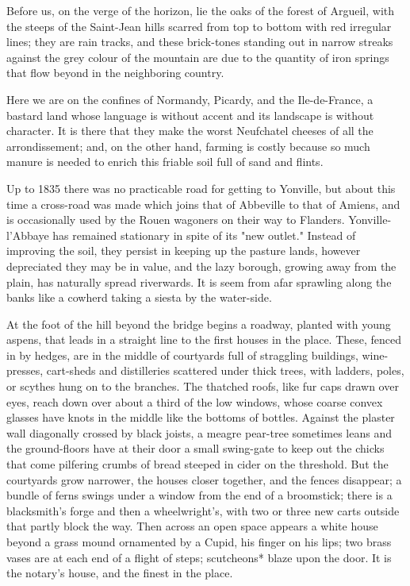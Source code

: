 \documentclass{tufte-book}
\begin{document}
Before us, on the verge of the horizon, lie the oaks of the forest of
Argueil, with the steeps of the Saint-Jean hills scarred from top
to bottom with red irregular lines; they are rain tracks, and these
brick-tones standing out in narrow streaks against the grey colour of
the mountain are due to the quantity of iron springs that flow beyond in
the neighboring country.

Here we are on the confines of Normandy, Picardy, and the Ile-de-France,
a bastard land whose language is without accent and its landscape is
without character. It is there that they make the worst Neufchatel
cheeses of all the arrondissement; and, on the other hand, farming is
costly because so much manure is needed to enrich this friable soil full
of sand and flints.

Up to 1835 there was no practicable road for getting to Yonville, but
about this time a cross-road was made which joins that of Abbeville to
that of Amiens, and is occasionally used by the Rouen wagoners on their
way to Flanders. Yonville-l'Abbaye has remained stationary in spite of
its "new outlet." Instead of improving the soil, they persist in keeping
up the pasture lands, however depreciated they may be in value, and
the lazy borough, growing away from the plain, has naturally spread
riverwards. It is seem from afar sprawling along the banks like a
cowherd taking a siesta by the water-side.

At the foot of the hill beyond the bridge begins a roadway, planted with
young aspens, that leads in a straight line to the first houses in the
place. These, fenced in by hedges, are in the middle of courtyards
full of straggling buildings, wine-presses, cart-sheds and distilleries
scattered under thick trees, with ladders, poles, or scythes hung on to
the branches. The thatched roofs, like fur caps drawn over eyes, reach
down over about a third of the low windows, whose coarse convex glasses
have knots in the middle like the bottoms of bottles. Against the
plaster wall diagonally crossed by black joists, a meagre pear-tree
sometimes leans and the ground-floors have at their door a small
swing-gate to keep out the chicks that come pilfering crumbs of bread
steeped in cider on the threshold. But the courtyards grow narrower,
the houses closer together, and the fences disappear; a bundle of
ferns swings under a window from the end of a broomstick; there is a
blacksmith's forge and then a wheelwright's, with two or three new carts
outside that partly block the way. Then across an open space appears a
white house beyond a grass mound ornamented by a Cupid, his finger
on his lips; two brass vases are at each end of a flight of steps;
scutcheons* blaze upon the door. It is the notary's house, and the
finest in the place.
\end{document}
